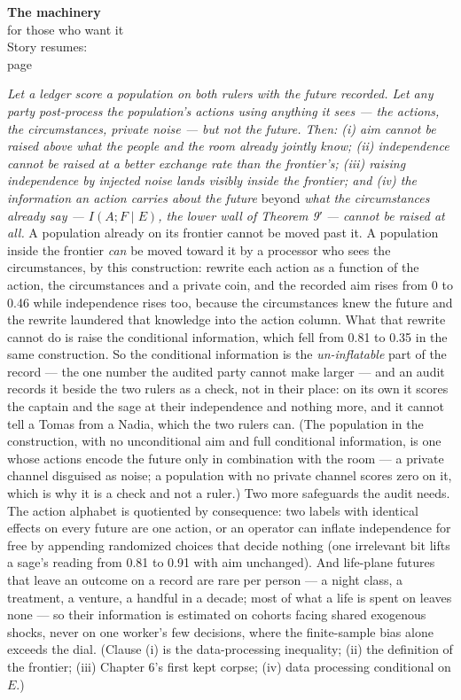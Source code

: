 \begin{machinery}{\textbf{The machinery}\\for those who want it\\[3pt]{\color{muted}Story resumes:\\page~\pageref{ch14}}}

\label{claim-29}

\noindent \emph{Let a ledger score a population on both rulers with the
future recorded. Let any party post-process the population's actions
using anything it sees --- the actions, the circumstances, private noise
--- but not the future. Then: (i) aim cannot be raised above what the
people and the room already jointly know; (ii) independence cannot be
raised at a better exchange rate than the frontier's; (iii) raising
independence by injected noise lands visibly inside the frontier; and
(iv) the information an action carries about the future} beyond \emph{what
the circumstances already say --- \(I(A;F \mid E)\), the lower wall of Theorem 9′
--- cannot be raised at all.} A population already on its frontier cannot
be moved past it. A population inside the frontier \emph{can} be moved
toward it by a processor who sees the circumstances, by this
construction: rewrite each action as a function of
the action, the circumstances and a private coin, and the recorded aim
rises from 0 to 0.46 while independence rises too, because the
circumstances knew the future and the rewrite laundered that knowledge
into the action column. What that rewrite cannot do is raise the
conditional information, which fell from 0.81 to 0.35 in the same
construction. So the conditional information is the \emph{un-inflatable}
part of the record --- the one number the audited party cannot make
larger --- and an audit records it beside the two rulers as a check, not
in their place: on its own it scores the captain and the sage at their
independence and nothing more, and it cannot tell a Tomas from a Nadia,
which the two rulers can. (The population in the construction, with no
unconditional aim and full conditional information, is one whose
actions encode the future only in combination with the room --- a
private channel disguised as noise; a population with no private
channel scores zero on it, which is why it is a check and not a ruler.)
Two more safeguards the audit needs. The action alphabet is quotiented by consequence: two labels
with identical effects on every future are one action, or an operator
can inflate independence for free by appending randomized choices that
decide nothing (one irrelevant bit lifts a sage's reading from 0.81 to
0.91 with aim unchanged). And life-plane futures that leave an outcome on a record are rare per
person --- a night class, a treatment, a venture, a handful in a decade;
most of what a life is spent on leaves none --- so their
information is estimated on cohorts facing shared exogenous shocks,
never on one worker's few decisions, where the finite-sample bias alone
exceeds the dial.
(Clause (i) is the data-processing inequality; (ii) the definition of
the frontier; (iii) Chapter 6's first kept corpse; (iv) data processing
conditional on \(E\).)


\end{machinery}
